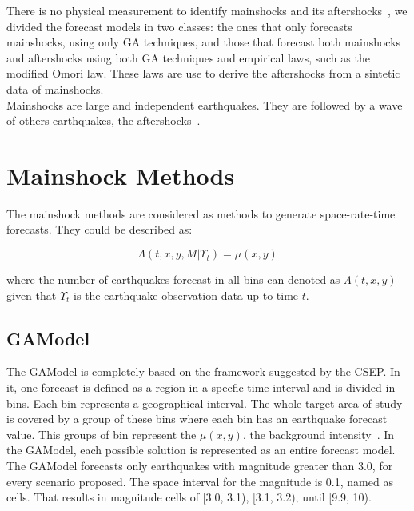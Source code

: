 There is no physical measurement to identify mainshocks and its aftershocks~\cite{schorlemmer2010first}, we divided the forecast models in two classes: the ones that only forecasts mainshocks, using only GA techniques, and those that forecast both mainshocks and aftershocks using both GA techniques and empirical laws, such as the modified Omori law. These laws are use to derive the aftershocks from a sintetic data of mainshocks.\\

Mainshocks are large and independent earthquakes. They are followed by a wave of others earthquakes, the aftershocks~\cite{schorlemmer2010first}.\\

\section{Mainshock Methods}\label{mainshocksMethods}
The mainshock methods are considered as methods to generate space-rate-time forecasts. They could be described as:

\begin{equation}\label{gamodel}
 \Lambda(t,x,y,M|\Upsilon_t) = \mu(x,y)
\end{equation}

where the number of earthquakes forecast in all bins can denoted as $\Lambda(t,x,y)$~\cite{zechar2010evaluating} given that $\Upsilon_t$ is the earthquake observation data up to time $t$.\\

\subsection{GAModel}\label{GAModel}
The GAModel is completely based on the framework suggested by the CSEP. In it, one forecast is defined as a region in a specfic time interval and is divided in bins. Each bin represents a geographical interval. The whole target area of study is covered by a group of these bins where each bin has an earthquake forecast value. This groups of bin represent the $\mu(x,y)$, the background intensity~\cite{zhuang2004analyzing}. In the GAModel, each possible solution is represented as an entire forecast model.\\

The GAModel forecasts only earthquakes with magnitude greater than 3.0, for every scenario proposed. The space interval for the magnitude is 0.1, named as cells. That results in magnitude cells of [3.0, 3.1), [3.1, 3.2), until [9.9, 10).\\


